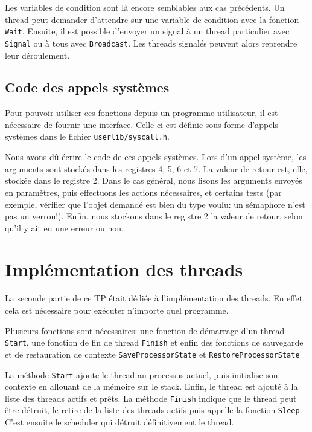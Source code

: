 \documentclass{article}
\def\file#1{\texttt{#1}}
\def\fun#1{\texttt{#1}}
\begin{document}
  Les variables de condition sont là encore semblables aux cas précédents. Un thread peut demander d'attendre sur une variable de condition avec la fonction \fun{Wait}. Ensuite, il est possible d'envoyer un signal à un thread particulier avec \fun{Signal} ou à tous avec \fun{Broadcast}. Les threads signalés peuvent alors reprendre leur déroulement.

\subsection{Code des appels systèmes}

  Pour pouvoir utiliser ces fonctions depuis un programme utilisateur, il est nécessaire de fournir une interface. Celle-ci est définie sous forme d'appels systèmes dans le fichier \file{userlib/syscall.h}.

  Nous avons dû écrire le code de ces appels systèmes. Lors d'un appel système, les arguments sont stockés dans les registres 4, 5, 6 et 7. La valeur de retour est, elle, stockée dans le registre 2.
  Dans le cas général, nous lisons les arguments envoyés en paramètres, puis effectuons les actions nécessaires, et certains tests (par exemple, vérifier que l'objet demandé est bien du type voulu: un sémaphore n'est pas un verrou!). Enfin, nous stockons dans le registre 2 la valeur de retour, selon qu'il y ait eu une erreur ou non.

\section{Implémentation des threads}

La seconde partie de ce TP était dédiée à l'implémentation des threads. En effet, cela est nécessaire pour exécuter n'importe quel programme.

Plusieurs fonctions sont nécessaires: une fonction de démarrage d'un thread \fun{Start}, une fonction de fin de thread \fun{Finish} et enfin des fonctions de sauvegarde et de restauration de contexte \fun{SaveProcessorState} et \fun{RestoreProcessorState}

La méthode \fun{Start} ajoute le thread au processus actuel, puis initialise son contexte en allouant de la mémoire sur le stack. Enfin, le thread est ajouté à la liste des threads actifs et prêts.
La méthode \fun{Finish} indique que le thread peut être détruit, le retire de la liste des threads actifs puis appelle la fonction \fun{Sleep}. C'est ensuite le scheduler qui détruit définitivement le thread.
\end{document}
